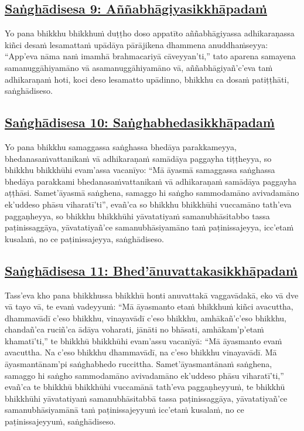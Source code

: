 \subsection*{\hyperref[comm9]{Saṅghādisesa 9: Aññabhāgiyasikkhāpadaṁ}}
\label{sd9}

Yo pana bhikkhu bhikkhuṁ duṭṭho doso appatīto aññabhāgiyassa adhikaraṇassa kiñci desaṁ lesamattaṁ upādāya pārājikena dhammena anuddhaṁseyya: ``App'eva nāma naṁ imamhā brahmacariyā cāveyyan'ti,'' tato aparena samayena samanuggāhiyamāno vā asamanuggāhiyamāno vā, aññabhāgiyañ'c'eva taṁ adhikaraṇaṁ hoti, koci deso lesamatto upādinno, bhikkhu ca dosaṁ patiṭṭhāti, saṅghādiseso.



\subsection*{\hyperref[comm10]{Saṅghādisesa 10: Saṅghabhedasikkhāpadaṁ}}
\label{sd10}

Yo pana bhikkhu samaggassa saṅghassa bhedāya parakkameyya, bhedanasaṁvattanikaṁ vā adhikaraṇaṁ samādāya paggayha tiṭṭheyya, so bhikkhu bhikkhūhi evam'assa vacanīyo: ``Mā āyasmā samaggassa saṅghassa bhedāya parakkami bhedanasaṁvattanikaṁ vā adhikaraṇaṁ samādāya paggayha aṭṭhāsi. Samet'āyasmā saṅghena, samaggo hi saṅgho sammodamāno avivadamāno ek'uddeso phāsu viharatī'ti'', evañ'ca so bhikkhu bhikkhūhi vuccamāno tath'eva paggaṇheyya, so bhikkhu bhikkhūhi yāvatatiyaṁ samanubhāsitabbo tassa paṭinissaggāya, yāvatatiyañ'ce samanubhāsiyamāno taṁ paṭinissajeyya, icc'etaṁ kusalaṁ, no ce paṭinissajeyya, saṅghādiseso.



\subsection*{\hyperref[comm11]{Saṅghādisesa 11: Bhed'ānuvattakasikkhāpadaṁ}}
\label{sd11}

Tass'eva kho pana bhikkhussa bhikkhū honti anuvattakā vaggavādakā, eko vā dve vā tayo vā, te evaṁ vadeyyuṁ: ``Mā āyasmanto etaṁ bhikkhuṁ kiñci avacuttha, dhammavādī c'eso bhikkhu, vinayavādī c'eso bhikkhu, amhākañ'c'eso bhikkhu, chandañ'ca ruciñ'ca ādāya voharati, jānāti no bhāsati, amhākam'p'etaṁ khamatī'ti,'' te bhikkhū bhikkhūhi evam'assu vacanīyā: ``Mā āyasmanto evaṁ avacuttha. Na c'eso bhikkhu dhammavādī, na c'eso bhikkhu vinayavādī. Mā āyasmantānam'pi saṅghabhedo ruccittha. Samet'āyasmantānaṁ saṅghena, samaggo hi saṅgho sammodamāno avivadamāno ek'uddeso phāsu viharatī'ti,'' evañ'ca te bhikkhū bhikkhūhi vuccamānā tath'eva paggaṇheyyuṁ, te bhikkhū bhikkhūhi yāvatatiyaṁ samanubhāsitabbā tassa paṭinissaggāya, yāvatatiyañ'ce samanubhāsiyamānā taṁ paṭinissajeyyuṁ icc'etaṁ kusalaṁ, no ce paṭinissajeyyuṁ, saṅghādiseso.



